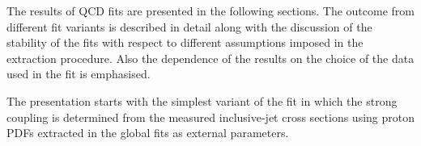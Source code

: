 The results of QCD fits are presented in the following sections. The outcome from different fit variants is described in detail along with the discussion of the stability of the fits with respect to different assumptions imposed in the \asz extraction procedure. Also the dependence of the results on the choice of the data used in the fit is emphasised.

The presentation starts with the simplest variant of the fit in which the strong coupling \asz is determined from the measured inclusive-jet cross sections using proton PDFs extracted in the global fits as external parameters.